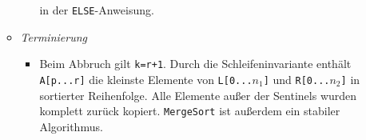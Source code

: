 \begin{itemize}
\begin{itemize}
\begin{itemize}
                            in der \texttt{ELSE}-Anweisung. 
                    \end{itemize}
                \item \textit{Terminierung}
                    \begin{itemize}
                        \item[]
                            Beim Abbruch gilt \texttt{k=r+1}. Durch die Schleifeninvariante enthält \texttt{A[p...r]} die kleinste Elemente von 
                            \texttt{L[0...$n_1$]} und \texttt{R[0...$n_2$]} in sortierter Reihenfolge. Alle Elemente außer der Sentinels wurden
                            komplett zurück kopiert. \texttt{MergeSort} ist außerdem ein stabiler Algorithmus.
                    \end{itemize}
            \end{itemize}


\end{itemize}

